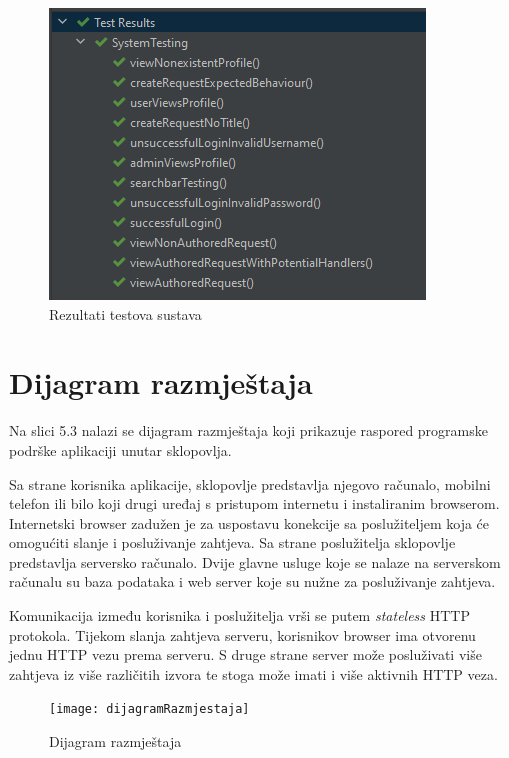 			
			
			
			\begin{figure}[H]
				\includegraphics[scale=1.2]{slike/selenium-testing.png}
				\centering
				\caption{Rezultati testova sustava}
				
			\end{figure}
			
			 
			
			\eject 
		
		
		\section{Dijagram razmještaja}
			
			Na slici 5.3 nalazi se dijagram razmještaja koji prikazuje raspored programske podrške aplikaciji unutar sklopovlja.
			
			Sa strane korisnika aplikacije, sklopovlje predstavlja njegovo računalo, mobilni telefon ili bilo koji drugi uređaj s pristupom internetu i instaliranim browserom.
			Internetski browser zadužen je za uspostavu konekcije sa poslužiteljem koja će omogućiti slanje i posluživanje zahtjeva.
			Sa strane poslužitelja sklopovlje predstavlja serversko računalo.
			Dvije glavne usluge koje se nalaze na serverskom računalu su baza podataka i web server koje su nužne za posluživanje zahtjeva.
			
			Komunikacija između korisnika i poslužitelja vrši se putem \textit{stateless} HTTP protokola. 
			Tijekom slanja zahtjeva serveru, korisnikov browser ima otvorenu jednu HTTP vezu prema serveru.
			S druge strane server može posluživati više zahtjeva iz više različitih izvora te stoga može imati i više aktivnih HTTP veza.
			
			\begin{figure}[h]
				\texttt{[image: dijagramRazmjestaja]}
				\caption{Dijagram razmještaja}
			\end{figure} 
			
